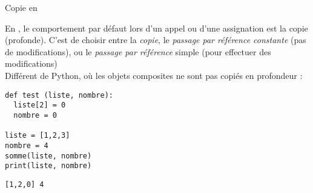 \documentclass[c]{beamer}
\begin{document}

\begin{frame}[fragile]{Copie en \Cpp}

En \Cpp, le comportement par défaut lors d'un appel ou d'une assignation est la copie (profonde). C'est  de choisir entre la \textit{copie}, le \textit{passage par référence constante} (pas de modifications), ou le \textit{passage par référence} simple (pour effectuer des modifications)\\

\pause
Différent de Python, où les objets composites ne sont pas copiés en profondeur :
\begin{verbatim}
def test (liste, nombre):
  liste[2] = 0
  nombre = 0

liste = [1,2,3]
nombre = 4
somme(liste, nombre)
print(liste, nombre)
\end{verbatim}
\begin{cbox}
\texttt{[1,2,0] 4}
\end{cbox}

\end{frame}
\end{document}
